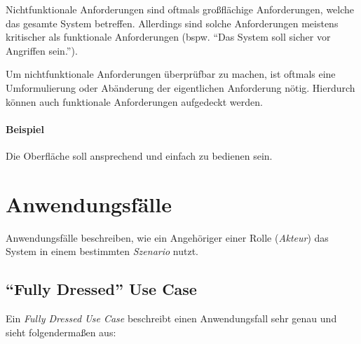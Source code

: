 				Nichtfunktionale Anforderungen sind oftmals großflächige Anforderungen, welche das gesamte System betreffen. Allerdings sind solche Anforderungen meistens kritischer als funktionale Anforderungen (bspw. \enquote{Das System soll sicher vor Angriffen sein.}).

				Um nichtfunktionale Anforderungen überprüfbar zu machen, ist oftmals eine Umformulierung oder Abänderung der eigentlichen Anforderung nötig. Hierdurch können auch funktionale Anforderungen aufgedeckt werden.

				\paragraph{Beispiel}
					Die Oberfläche soll ansprechend und einfach zu bedienen sein.

	\section{Anwendungsfälle}
		Anwendungsfälle beschreiben, wie ein Angehöriger einer Rolle (\textit{Akteur}) das System in einem bestimmten \textit{Szenario} nutzt.

		\subsection{\enquote{Fully Dressed} Use Case}
			Ein \textit{Fully Dressed Use Case} beschreibt einen Anwendungsfall sehr genau und sieht folgendermaßen aus:

